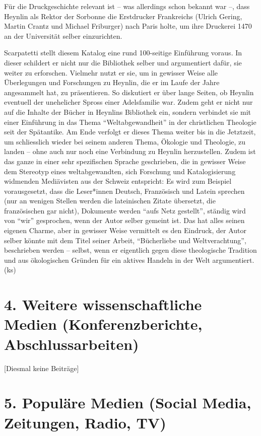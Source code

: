 \documentclass[a4paper,
fontsize=11pt,
oneside,
numbers=noperiodatend,
parskip=half-,
bibliography=totoc,
final
]{scrartcl}
\begin{document}
Für die Druckgeschichte relevant ist -- was allerdings schon bekannt war
--, dass Heynlin als Rektor der Sorbonne die Erstdrucker Frankreichs
(Ulrich Gering, Martin Crantz und Michael Friburger) nach Paris holte,
um ihre Druckerei 1470 an der Universität selber einzurichten.

Scarpatetti stellt diesem Katalog eine rund 100-seitige Einführung
voraus. In dieser schildert er nicht nur die Bibliothek selber und
argumentiert dafür, sie weiter zu erforschen. Vielmehr nutzt er sie, um
in gewisser Weise alle Überlegungen und Forschungen zu Heynlin, die er
im Laufe der Jahre angesammelt hat, zu präsentieren. So diskutiert er
über lange Seiten, ob Heynlin eventuell der unehelicher Spross einer
Adelsfamilie war. Zudem geht er nicht nur auf die Inhalte der Bücher in
Heynlins Bibliothek ein, sondern verbindet sie mit einer Einführung in
das Thema ``Weltabgewandheit'' in der christlichen Theologie seit der
Spätantike. Am Ende verfolgt er dieses Thema weiter bis in die
Jetztzeit, um schliesslich wieder bei seinem anderen Thema, Ökologie und
Theologie, zu landen -- ohne auch nur noch eine Verbindung zu Heynlin
herzustellen. Zudem ist das ganze in einer sehr spezifischen Sprache
geschrieben, die in gewisser Weise dem Stereotyp eines weltabgewandten,
sich Forschung und Katalogisierung widmenden Mediävisten aus der Schweiz
entspricht: Es wird zum Beispiel vorausgesetzt, dass die Leser*innen
Deutsch, Französisch und Latein sprechen (nur an wenigen Stellen werden
die lateinischen Zitate übersetzt, die französischen gar nicht),
Dokumente werden ``aufs Netz gestellt'', ständig wird von ``wir''
gesprochen, wenn der Autor selber gemeint ist. Das hat alles seinen
eigenen Charme, aber in gewisser Weise vermittelt es den Eindruck, der
Autor selber könnte mit dem Titel seiner Arbeit, ``Bücherliebe und
Weltverachtung'', beschrieben werden -- selbst, wenn er eigentlich gegen
diese theologische Tradition und aus ökologischen Gründen für ein
aktives Handeln in der Welt argumentiert. (ks)

\section{4. Weitere wissenschaftliche Medien (Konferenzberichte,
Abschlussarbeiten)}\label{weitere-wissenschaftliche-medien-konferenzberichte-abschlussarbeiten}

{[}Diesmal keine Beiträge{]}

\section{5. Populäre Medien (Social Media, Zeitungen, Radio,
TV)}\label{populuxe4re-medien-social-media-zeitungen-radio-tv}
\end{document}
